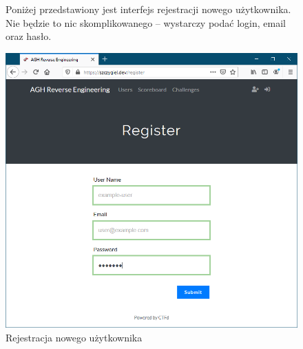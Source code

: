 \documentclass[polish,12pt]{aghthesis}
\begin{document}
\begin{figure}[ht]
    Poniżej przedstawiony jest interfejs rejestracji nowego użytkownika.
    Nie będzie to nic skomplikowanego -- wystarczy podać login, email oraz hasło.

    \vspace{1cm}

    \centering
    \includegraphics[width=14cm]{szczygiel_dev_register}
    \caption{Rejestracja nowego użytkownika}
    \label{fig:szczygiel_dev_register}
\end{figure}
\end{document}
